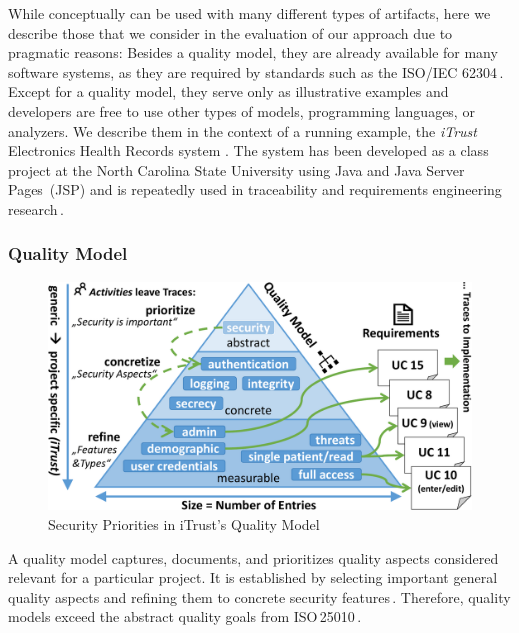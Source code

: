 While conceptually \appr{} can be used with many different types of artifacts, here we describe those that we consider in the evaluation of our approach due to pragmatic reasons: Besides a quality model, they are already available for many software systems, as they are required by standards such as the ISO/IEC 62304\,\cite{IEC62304}.
Except for a quality model, they serve only as illustrative examples and developers are free to use other types of models, programming languages, or analyzers.
We describe them in the context of a running example, the \emph{iTrust} Electronics Health Records system \cite{heckman2018}.
The system has been developed as a class project at the North Carolina State University using Java and Java Server Pages~(JSP) and is repeatedly used in traceability and requirements engineering research\,\cite{zogaan2017datasets,MOHA2010,BSGRJS2018,Peldszus2019SDF,PBKJ2021,TPS2022}.


\subsubsection{Quality Model}

\begin{figure}
	\centering
	\includegraphics[width=0.7\columnwidth]{figures/QM}%
	\caption{%
	Security Priorities in iTrust's Quality Model}
	\label{fig:qmodel}
\end{figure}

A quality model captures, documents, and prioritizes quality aspects considered relevant for a particular project.
It is established by selecting important general quality aspects and refining them to concrete security features\,\cite{wagner2009security}.
Therefore, quality models exceed the abstract quality goals from ISO\,25010\,\cite{ISO25010,Schneider2012ASQ,WAGNER2015101}.

